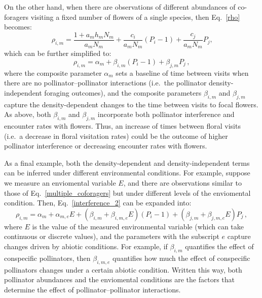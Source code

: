 \begin{refsection}
On the other hand, when there are observations of different abundances of co-foragers visiting a fixed number of flowers of a single species, then Eq.~\ref{rho} becomes:
\begin{equation}
	\label{multiple_coforagers}
\rho_{i,m} = \frac{1+a_{m}h_{m}N_{m}}{a_{m}N_{m}} +\frac{c_{i}}{a_{m}N_{m}} (P_{i}-1) +\frac{c_{j}}{a_{m}N_{m}} P_{j}  \text{,}
\end{equation}
which can be further simplified to:
\begin{equation}
\label{interference_2}
		\rho_{i,m} =\alpha_{m} + \beta_{i,m} (P_{i}-1) + \beta_{j,m} P_{j} \,,
\end{equation}
where the composite parameter $\alpha_{m}$ sets a baseline of time between visits when there are no pollinator--pollinator interactions (i.e.\ the pollinator density-independent foraging outcomes), and the composite parameters $\beta_{i,m}$ and $\beta_{j,m}$ capture the  density-dependent changes to the time between visits to focal flowers. As above, both $\beta_{i,m}$ and $\beta_{j,m}$ incorporate both pollinator interference and encounter rates with flowers. Thus, an increase of times between floral visits (i.e.\ a decrease in floral visitation rates) could be the outcome of higher pollinator interference or decreasing encounter rates with flowers.

As a final example, both the density-dependent and density-independent terms can be inferred under different environmental conditions. For example, suppose we measure an enviomental variable $E$, and there are observations similar to those of Eq.~\ref{multiple_coforagers} but under different levels of the enviomental condition. Then, Eq.~\ref{interference_2} can be expanded into:
\begin{equation}
\label{interference_environment}
		\rho_{i,m} =\alpha_{m}+
		\alpha_{m,e} E +
	   (\beta_{i,m} + \beta_{i,m,e} E) (P_{i}-1) +
		(\beta_{j,m} + \beta_{j,m,e} E ) P_{j} \,,
\end{equation}
where $E$ is the value of the measured environmental variable (which can take continuous or discrete values), and the parameters with the subscript $e$ capture changes driven by abiotic conditions. For example, if $\beta_{i,m}$ quantifies the effect of conspecific pollinators, then $\beta_{i,m,e}$  quantifies how much the effect of conspecific pollinators changes under a certain abiotic condition. Written this way, both pollinator abundances and the enviomental conditions are the factors that determine the effect of pollinator--pollinator interactions.



\end{refsection}
